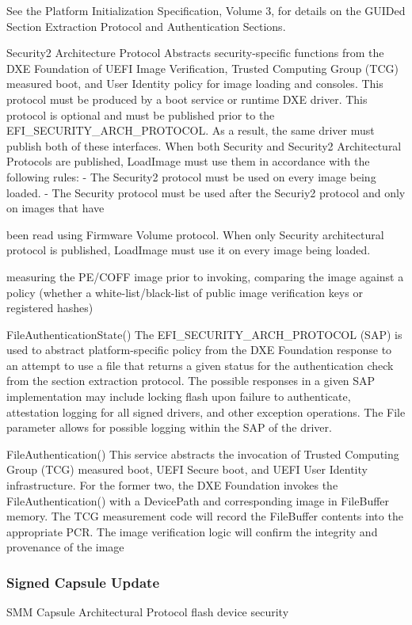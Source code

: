 See the Platform Initialization Specification, Volume 3, for details on
the GUIDed Section Extraction Protocol and Authentication Sections.

Security2 Architecture Protocol
Abstracts security-specific functions from the DXE Foundation of UEFI Image Verification,
Trusted Computing Group (TCG) measured boot, and User Identity policy for image loading and
consoles. This protocol must be produced by a boot service or runtime DXE driver.
This protocol is optional and must be published prior to the EFI_SECURITY_ARCH_PROTOCOL.
As a result, the same driver must publish both of these interfaces.
When both Security and Security2 Architectural Protocols are published, LoadImage must use
them in accordance with the following rules:
- The Security2 protocol must be used on every image being loaded.
- The Security protocol must be used after the Securiy2 protocol and only on images that have

been read using Firmware Volume protocol.
When only Security architectural protocol is published, LoadImage must use it on every image
being loaded.

measuring the PE/COFF image prior to invoking, comparing the
image against a policy (whether a white-list/black-list of public image verification keys or registered
hashes)

FileAuthenticationState()
The EFI_SECURITY_ARCH_PROTOCOL (SAP) is used to abstract platform-specific policy from
the DXE Foundation response to an attempt to use a file that returns a given status for the
authentication check from the section extraction protocol.
The possible responses in a given SAP implementation may include locking flash upon failure to
authenticate, attestation logging for all signed drivers, and other exception operations. The File
parameter allows for possible logging within the SAP of the driver.

FileAuthentication()
This service abstracts the invocation of Trusted Computing Group (TCG) measured boot, UEFI
Secure boot, and UEFI User Identity infrastructure. For the former two, the DXE Foundation
invokes the FileAuthentication() with a DevicePath and corresponding image in
FileBuffer memory. The TCG measurement code will record the FileBuffer contents into the
appropriate PCR. The image verification logic will confirm the integrity and provenance of the
image

\subsubsection{Signed Capsule Update}
SMM
Capsule Architectural Protocol
flash device security
